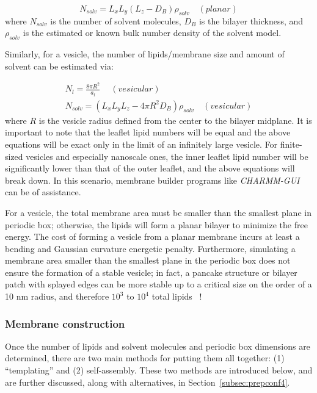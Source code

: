 \documentclass[9pt,bestpractices,pubversion]{livecoms}
\begin{document}
\begin{equation}\label{eq:3}
	N_{solv} = L_x L_y (L_z - D_B) \rho_{solv} \quad (planar)
\end{equation}
where $N_{solv}$ is the number of solvent molecules, $D_B$ is the bilayer thickness, and $\rho_{solv}$ is the estimated or known bulk number density of the solvent model.

Similarly, for a vesicle, the number of lipids/membrane size and amount of solvent can be estimated via:

\begin{subequations}\label{eq:4}
\begin{align}
N_l = \frac{8 \pi R^2}{a_l}\ \quad (vesicular)\label{eq:4a} \\
N_{solv} = (L_x L_y L_z - 4\pi R^2 D_B) \rho_{solv} \quad (vesicular)\label{eq:4b}
\end{align}
\end{subequations}
where $R$ is the vesicle radius defined from the center to the bilayer midplane.
It is important to note that the leaflet lipid numbers will be equal and the above equations will be exact only in the limit of an infinitely large vesicle.
For finite-sized vesicles and especially nanoscale ones, the inner leaflet lipid number will be significantly lower than that of the outer leaflet, and the above equations will break down.
In this scenario, membrane builder programs like \textit{CHARMM-GUI} can be of assistance.

For a vesicle, the total membrane area must be smaller than the smallest plane in periodic box; otherwise, the lipids will form a planar bilayer to minimize the free energy.
The cost of forming a vesicle from a planar membrane incurs at least a bending and Gaussian curvature energetic penalty.
Furthermore, simulating a membrane area smaller than the smallest plane in the periodic box does not ensure the formation of a stable vesicle; in fact, a pancake structure or bilayer patch with splayed edges can be more stable up to a critical size on the order of a 10 nm radius, and therefore $10^3$ to $10^4$ total lipids ~\cite{Deserno2009}!

\subsubsection{Membrane construction}
\label{subsubsec:construction}
Once the number of lipids and solvent molecules and periodic box dimensions are determined, there are two main methods for putting them all together: (1) ``templating'' and (2) self-assembly. These two methods are introduced below, and are further discussed, along with alternatives, in Section~\ref{subsec:prepconf4}.
\end{document}
